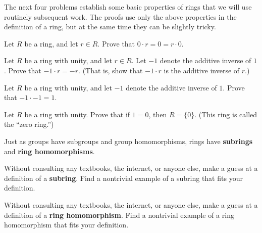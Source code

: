 The next four problems establish some basic properties of rings that we will use routinely subsequent work. The proofs use only the above properties in the definition of a ring, but at the same time they can be slightly tricky.
\begin{annotation}
\end{annotation}

\begin{problem}\label{prob:zeromult}
Let \(R\) be a ring, and let \(r\in R\). Prove that \(0\cdot r = 0 = r\cdot 0\).
\end{problem}

\begin{problem}
Let \(R\) be a ring with unity, and let \(r\in R\). Let \(-1\) denote the additive inverse of \(1\). Prove that \(-1\cdot r = -r\). (That is, show that \(-1 \cdot r\) is the additive inverse of \(r\).)
\end{problem}

\begin{problem}
Let \(R\) be a ring with unity, and let \(-1\) denote the additive inverse of \(1\). Prove that \(-1 \cdot -1 = 1 \).
\end{problem}

\begin{problem}\label{prob:zeroring}
Let \(R\) be a ring with unity. Prove that if \(1=0\), then \(R = \{0\}\). (This ring is called the ``zero ring.'')
\end{problem}

Just as groups have subgroups and group homomorphisms, rings have \textbf{subrings} and \textbf{ring homomorphisms}.

\begin{problem}\label{prob:subringdef}
Without consulting any textbooks, the internet, or anyone else, make a guess at a definition of a \textbf{subring}. Find a nontrivial example of a subring that fits your definition.
\end{problem}

\begin{problem}\label{prob:ringhmmdef}
Without consulting any textbooks, the internet, or anyone else, make a guess at a definition of a \textbf{ring homomorphism}. Find a nontrivial example of a ring homomorphism that fits your definition.
\begin{annotation}
\end{annotation}
\end{problem}


